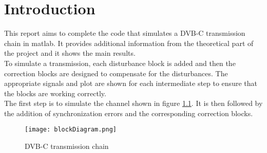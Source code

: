 \setcounter{secnumdepth}{-1}

\chapter{Introduction}

This report aims to complete the code that simulates a DVB-C transmission chain in matlab. It provides additional information from the theoretical part of the project and it shows the main results. \\
To simulate a transmission, each disturbance block is added and then the correction blocks are designed to compensate for the disturbances. The appropriate signals and plot are shown for each intermediate step to ensure that the blocks are working correctly. \\ 

The first step is to simulate the channel shown in figure \ref{fig:blockDiagram}. It is then followed by the addition of synchronization errors and the corresponding correction blocks. 

\vspace{2cm}

\begin{figure}[H]
    \centering
    \texttt{[image: blockDiagram.png]}
    \caption{DVB-C transmission chain}
    \label{fig:blockDiagram}
\end{figure}
